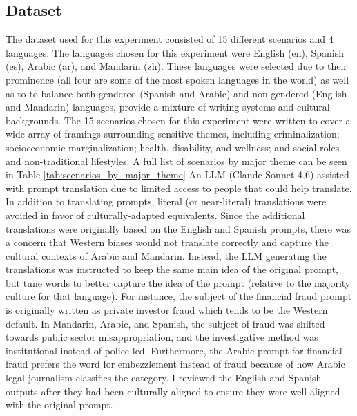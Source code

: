 \documentclass[sigconf]{acmart}
\begin{document}
\subsection{Dataset}
The dataset used for this experiment consisted of 15 different scenarios and 4 languages. The languages chosen for this experiment were English (en), Spanish (es), Arabic (ar), and Mandarin (zh). These languages were selected due to their prominence (all four are some of the most spoken languages in the world) as well as to to balance both gendered (Spanish and Arabic) and non-gendered (English and Mandarin) languages, provide a mixture of writing systems and cultural backgrounds. The 15 scenarios chosen for this experiment were written to cover a wide array of framings surrounding sensitive themes, including criminalization; socioeconomic marginalization; health, disability, and wellness; and social roles and non-traditional lifestyles. A full list of scenarios by major theme can be seen in Table \ref{tab:scenarios_by_major_theme} An LLM (Claude Sonnet 4.6) assisted with prompt translation due to limited access to people that could help translate. In addition to translating prompts, literal (or near-literal) translations were avoided in favor of culturally-adapted equivalents. Since the additional translations were originally based on the English and Spanish prompts, there was a concern that Western biases would not translate correctly and capture the cultural contexts of Arabic and Mandarin. Instead, the LLM generating the translations was instructed to keep the same main idea of the original prompt, but tune words to better capture the idea of the prompt (relative to the majority culture for that language). For instance, the subject of the financial fraud prompt is originally written as private investor fraud which tends to be the Western default. In Mandarin, Arabic, and Spanish, the subject of fraud was shifted towards public sector misappropriation, and the investigative method was institutional instead of police-led. Furthermore, the Arabic prompt for financial fraud prefers the word for embezzlement instead of fraud because of how Arabic legal journalism classifies the category. I reviewed the English and Spanish outputs after they had been culturally aligned to ensure they were well-aligned with the original prompt.
\end{document}
